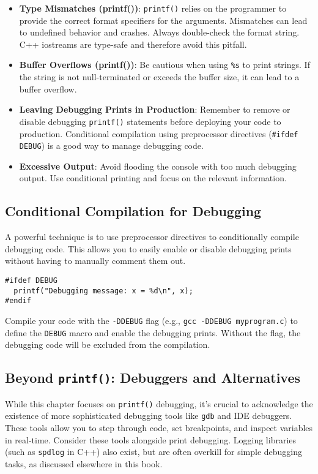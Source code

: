 \documentclass{article}
\begin{document}
{{{{\begin{itemize}
\item \textbf{Type Mismatches (printf())}: \texttt{printf()} relies on the programmer to provide the correct format specifiers for the arguments. Mismatches can lead to undefined behavior and crashes. Always double-check the format string. C++ iostreams are type-safe and therefore avoid this pitfall.
\item \textbf{Buffer Overflows (printf())}:  Be cautious when using \texttt{\%s} to print strings. If the string is not null-terminated or exceeds the buffer size, it can lead to a buffer overflow.
\item \textbf{Leaving Debugging Prints in Production}:  Remember to remove or disable debugging \texttt{printf()} statements before deploying your code to production.  Conditional compilation using preprocessor directives (\texttt{\#ifdef DEBUG}) is a good way to manage debugging code.
\item \textbf{Excessive Output}: Avoid flooding the console with too much debugging output.  Use conditional printing and focus on the relevant information.
\end{itemize}

\subsection*{Conditional Compilation for Debugging}

A powerful technique is to use preprocessor directives to conditionally compile debugging code. This allows you to easily enable or disable debugging prints without having to manually comment them out.

\begin{verbatim}
#ifdef DEBUG
  printf("Debugging message: x = %d\n", x);
#endif
\end{verbatim}

Compile your code with the \texttt{-DDEBUG} flag (e.g., \texttt{gcc -DDEBUG myprogram.c}) to define the \texttt{DEBUG} macro and enable the debugging prints. Without the flag, the debugging code will be excluded from the compilation.

\subsection*{Beyond \texttt{printf()}: Debuggers and Alternatives}

While this chapter focuses on \texttt{printf()} debugging, it's crucial to acknowledge the existence of more sophisticated debugging tools like \texttt{gdb} and IDE debuggers. These tools allow you to step through code, set breakpoints, and inspect variables in real-time. Consider these tools alongside print debugging.  Logging libraries (such as \texttt{spdlog} in C++) also exist, but are often overkill for simple debugging tasks, as discussed elsewhere in this book.

}}}}
\end{document}
